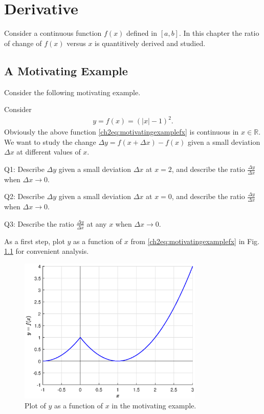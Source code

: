 \chapter{Derivative} \label{ch:derivative}

Consider a continuous function $f(x)$ defined in $\left[a,b\right]$. In this chapter the ratio of change of $f(x)$ versus $x$ is quantitively derived and studied.

\section{A Motivating Example}

Consider the following motivating example.

\begin{shortbox}

Consider
\begin{eqnarray}
  y = f(x) = \left(|x|-1\right)^2. \label{ch2eq:motivatingexamplefx}
\end{eqnarray}
Obviously the above function \eqref{ch2eq:motivatingexamplefx} is continuous in $x\in\mathbb{R}$. We want to study the change $\Delta y = f\left(x+\Delta x\right) - f(x)$ given a small deviation $\Delta x$ at different values of $x$.

Q1: Describe $\Delta y$ given a small deviation $\Delta x$ at $x=2$, and describe the ratio $\frac{\Delta y}{\Delta x}$ when $\Delta x \rightarrow 0$.

Q2: Describe $\Delta y$ given a small deviation $\Delta x$ at $x=0$, and describe the ratio $\frac{\Delta y}{\Delta x}$ when $\Delta x \rightarrow 0$.

Q3: Describe the ratio $\frac{\Delta y}{\Delta x}$ at any $x$ when $\Delta x \rightarrow 0$.
\end{shortbox}

As a first step, plot $y$ as a function of $x$ from \eqref{ch2eq:motivatingexamplefx} in Fig. \ref{ch2fig:fxsimpleexample} for convenient analysis.
\begin{figure}
\centering
\includegraphics[width=250pt]{chapters/part-1/figures/fig_derivative_motiexp.eps}
\caption{Plot of $y$ as a function of $x$ in the motivating example.} \label{ch2fig:fxsimpleexample}
\end{figure}

